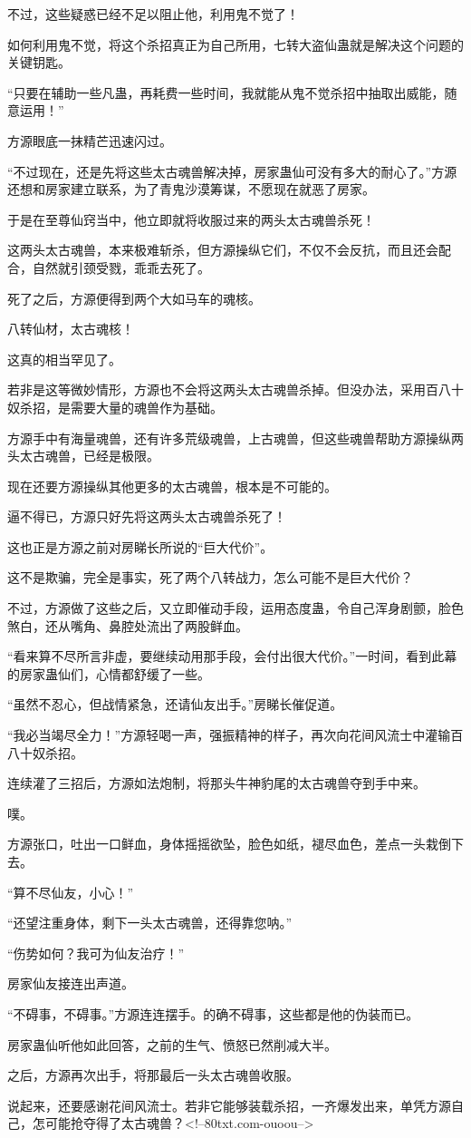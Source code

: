 \begin{this_body}
不过，这些疑惑已经不足以阻止他，利用鬼不觉了！

如何利用鬼不觉，将这个杀招真正为自己所用，七转大盗仙蛊就是解决这个问题的关键钥匙。

“只要在辅助一些凡蛊，再耗费一些时间，我就能从鬼不觉杀招中抽取出威能，随意运用！”

方源眼底一抹精芒迅速闪过。

“不过现在，还是先将这些太古魂兽解决掉，房家蛊仙可没有多大的耐心了。”方源还想和房家建立联系，为了青鬼沙漠筹谋，不愿现在就恶了房家。

于是在至尊仙窍当中，他立即就将收服过来的两头太古魂兽杀死！

这两头太古魂兽，本来极难斩杀，但方源操纵它们，不仅不会反抗，而且还会配合，自然就引颈受戮，乖乖去死了。

死了之后，方源便得到两个大如马车的魂核。

八转仙材，太古魂核！

这真的相当罕见了。

若非是这等微妙情形，方源也不会将这两头太古魂兽杀掉。但没办法，采用百八十奴杀招，是需要大量的魂兽作为基础。

方源手中有海量魂兽，还有许多荒级魂兽，上古魂兽，但这些魂兽帮助方源操纵两头太古魂兽，已经是极限。

现在还要方源操纵其他更多的太古魂兽，根本是不可能的。

逼不得已，方源只好先将这两头太古魂兽杀死了！

这也正是方源之前对房睇长所说的“巨大代价”。

这不是欺骗，完全是事实，死了两个八转战力，怎么可能不是巨大代价？

不过，方源做了这些之后，又立即催动手段，运用态度蛊，令自己浑身剧颤，脸色煞白，还从嘴角、鼻腔处流出了两股鲜血。

“看来算不尽所言非虚，要继续动用那手段，会付出很大代价。”一时间，看到此幕的房家蛊仙们，心情都舒缓了一些。

“虽然不忍心，但战情紧急，还请仙友出手。”房睇长催促道。

“我必当竭尽全力！”方源轻喝一声，强振精神的样子，再次向花间风流士中灌输百八十奴杀招。

连续灌了三招后，方源如法炮制，将那头牛神豹尾的太古魂兽夺到手中来。

噗。

方源张口，吐出一口鲜血，身体摇摇欲坠，脸色如纸，褪尽血色，差点一头栽倒下去。

“算不尽仙友，小心！”

“还望注重身体，剩下一头太古魂兽，还得靠您呐。”

“伤势如何？我可为仙友治疗！”

房家仙友接连出声道。

“不碍事，不碍事。”方源连连摆手。的确不碍事，这些都是他的伪装而已。

房家蛊仙听他如此回答，之前的生气、愤怒已然削减大半。

之后，方源再次出手，将那最后一头太古魂兽收服。

说起来，还要感谢花间风流士。若非它能够装载杀招，一齐爆发出来，单凭方源自己，怎可能抢夺得了太古魂兽？<!--80txt.com-ouoou-->

\end{this_body}

